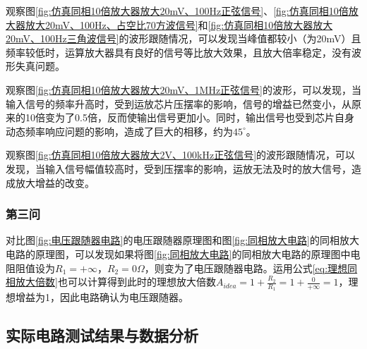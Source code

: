 \documentclass[./测控三级项目.tex]{subfiles} %
\begin{document}
			观察图\ref{fig:仿真同相10倍放大器放大20mV、100Hz正弦信号}、\ref{fig:仿真同相10倍放大器放大20mV、100Hz、占空比70方波信号}和\ref{fig:仿真同相10倍放大器放大20mV、100Hz三角波信号}的波形跟随情况，可以发现当峰值都较小（为20mV）且频率较低时，运算放大器具有良好的信号等比放大效果，且放大倍率稳定，没有波形失真问题。\par
			观察图\ref{fig:仿真同相10倍放大器放大20mV、1MHz正弦信号}的波形，可以发现，当输入信号的频率升高时，受到运放芯片压摆率的影响，信号的增益已然变小，从原来的10倍变为了0.5倍，反而使输出信号更加小。同时，输出信号也受到芯片自身动态频率响应问题的影响，造成了巨大的相移，约为$45^\circ$。\par
			观察图\ref{fig:仿真同相10倍放大器放大2V、100kHz正弦信号}的波形跟随情况，可以发现，当输入信号幅值较高时，受到压摆率的影响，运放无法及时的放大信号，造成放大增益的改变。
		\subsubsection{第三问}
			对比图\ref{fig:电压跟随器电路}的电压跟随器原理图和图\ref{fig:同相放大电路}的同相放大电路的原理图，可以发现如果将图\ref{fig:同相放大电路}的同相放大电路的原理图中电阻阻值设为$R_1=+\infty$，$R_2=0\Omega$，则变为了电压跟随器电路。运用公式\ref{eq:理想同相放大倍数}也可以计算得到此时的理想放大倍数$A_{idea}=1+\frac{R_2}{R_1}=1+\frac{0}{+\infty}=1$，理想增益为1，因此电路确认为电压跟随器。\par
	
	\subsection{实际电路测试结果与数据分析}
\end{document}
